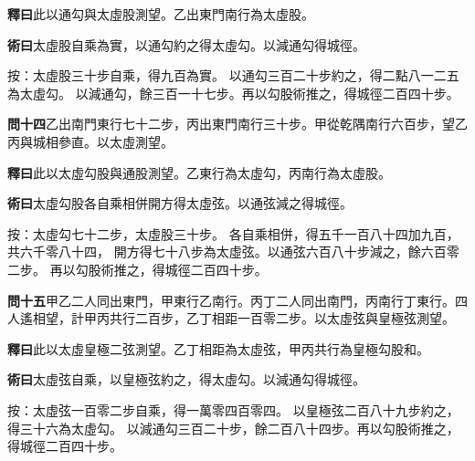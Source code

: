 \documentclass[12pt,a4paper]{article}
\begin{document}
\noindent\textbf{釋曰}\quad 此以通勾與太虛股測望。乙出東門南行為太虛股。

\vspace{0.3em}

\noindent\textbf{術曰}\quad 太虛股自乘為實，以通勾約之得太虛勾。以減通勾得城徑。

\vspace{0.3em}

\noindent
按：太虛股三十步自乘，得九百為實。
以通勾三百二十步約之，得二點八一二五為太虛勾。
以減通勾，餘三百一十七步。再以勾股術推之，得城徑二百四十步。

\vspace{0.5em}

\noindent\textbf{問十四}\quad 乙出南門東行七十二步，丙出東門南行三十步。甲從乾隅南行六百步，望乙丙與城相參直。以太虛測望。

\vspace{0.3em}

\noindent\textbf{釋曰}\quad 此以太虛勾股與通股測望。乙東行為太虛勾，丙南行為太虛股。

\vspace{0.3em}

\noindent\textbf{術曰}\quad 太虛勾股各自乘相併開方得太虛弦。以通弦減之得城徑。

\vspace{0.3em}

\noindent
按：太虛勾七十二步，太虛股三十步。
各自乘相併，得五千一百八十四加九百，共六千零八十四，
開方得七十八步為太虛弦。以通弦六百八十步減之，餘六百零二步。
再以勾股術推之，得城徑二百四十步。

\vspace{0.5em}

\noindent\textbf{問十五}\quad 甲乙二人同出東門，甲東行乙南行。丙丁二人同出南門，丙南行丁東行。四人遙相望，計甲丙共行二百步，乙丁相距一百零二步。以太虛弦與皇極弦測望。

\vspace{0.3em}

\noindent\textbf{釋曰}\quad 此以太虛皇極二弦測望。乙丁相距為太虛弦，甲丙共行為皇極勾股和。

\vspace{0.3em}

\noindent\textbf{術曰}\quad 太虛弦自乘，以皇極弦約之，得太虛勾。以減通勾得城徑。

\vspace{0.3em}

\noindent
按：太虛弦一百零二步自乘，得一萬零四百零四。
以皇極弦二百八十九步約之，得三十六為太虛勾。
以減通勾三百二十步，餘二百八十四步。再以勾股術推之，得城徑二百四十步。
\end{document}
